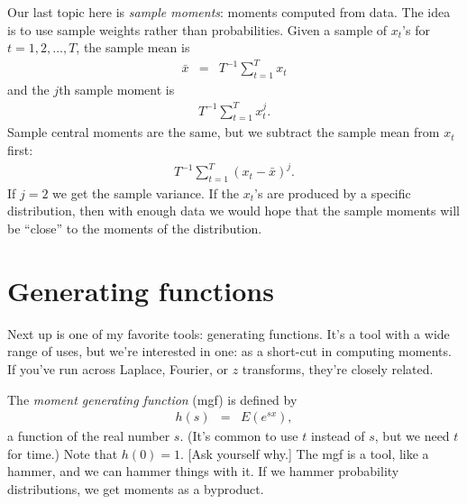 \documentclass[11pt]{article}
\begin{document}
Our last topic here is {\it sample moments\/}:
moments computed from data.
The idea is to use sample weights rather than probabilities.
Given a sample of $x_t$'s for $t=1,2,\ldots,T$,
the sample mean is
\begin{eqnarray*}
         \bar{x} &=& T^{-1} \sum_{t=1}^T x_t
\end{eqnarray*}
and the $j$th sample moment is
\begin{eqnarray*}
         T^{-1} \sum_{t=1}^T x_t^j .
\end{eqnarray*}
Sample central moments are the same, but we subtract the sample mean
from $x_t$ first:
\begin{eqnarray*}
         T^{-1} \sum_{t=1}^T (x_t-\bar{x})^j .
\end{eqnarray*}
If $j=2$ we get the sample variance.
If the $x_t$'s are produced by a specific distribution,
then with enough data we would hope that the sample moments will be ``close''
to the moments of the distribution.


\section{Generating functions}

Next up is one of my favorite tools:  generating functions.
It's a tool with a wide range of uses,
but we're interested in one:
as a short-cut in computing moments.
If you've run across Laplace, {Fourier}, or $z$ transforms,
they're closely related.

The {\it moment generating function\/} (mgf) is defined by
\begin{eqnarray}
    h(s) &=& E \left( e^{s x} \right) ,
    \label{eq:def-mgf}
\end{eqnarray}
a function of the real number $s$.
(It's common to use $t$ instead of $s$, but we need $t$ for time.)
Note that $h(0) = 1$.
[Ask yourself why.] 
The mgf is a tool, like a hammer, and we can hammer things with it.
If we hammer probability distributions, we get moments as a byproduct.
\end{document}
